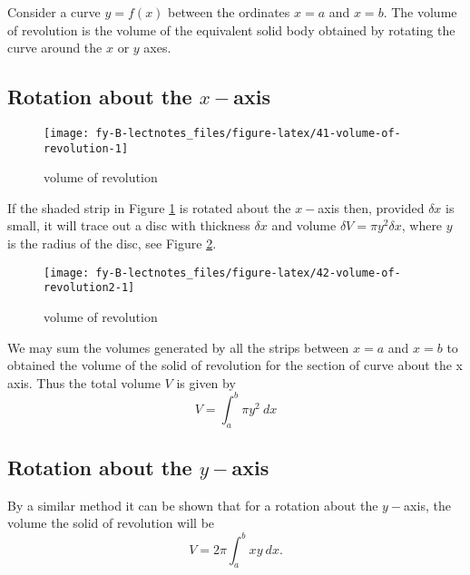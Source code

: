 \documentclass[
  11pt,
  oneside]{book}
\newcommand{\slide}{}
\theoremstyle{definition}
\theoremstyle{definition}
\theoremstyle{definition}
\theoremstyle{definition}
\theoremstyle{remark}
\begin{document}
Consider a curve \(y = f(x)\) between the ordinates \(x = a\) and \(x = b\). The volume of revolution is the volume of the equivalent solid body obtained by rotating the curve around the \(x\) or \(y\) axes.

\slide

\subsection{\texorpdfstring{Rotation about the \(x-\)axis}{Rotation about the x-axis}}\label{rotation-about-the-x-axis}

\begin{figure}

{\centering \texttt{[image: fy-B-lectnotes\_files/figure-latex/41-volume-of-revolution-1]} 

}

\caption{volume of revolution}\label{fig:41-volume-of-revolution}
\end{figure}

If the shaded strip in Figure \ref{fig:41-volume-of-revolution} is rotated about the \(x-\)axis then, provided \(\delta x\) is small, it will trace out a disc with thickness \(\delta x\) and volume \(\delta V = \pi y^2\delta x\), where \(y\) is the radius of the disc, see Figure \ref{fig:42-volume-of-revolution2}.
\slide

\begin{figure}

{\centering \texttt{[image: fy-B-lectnotes\_files/figure-latex/42-volume-of-revolution2-1]} 

}

\caption{volume of revolution}\label{fig:42-volume-of-revolution2}
\end{figure}

We may sum the volumes generated by all the strips between \(x = a\) and \(x = b\) to obtained the volume of the solid of revolution for the section of curve about the x axis.
Thus the total volume \(V\) is given by
\[
V = \int_a^b\pi y^2\ dx
\]
\slide

\subsection{\texorpdfstring{Rotation about the \(y-\)axis}{Rotation about the y-axis}}\label{rotation-about-the-y-axis}

By a similar method it can be shown that for a rotation about the \(y-\)axis, the volume the solid of revolution will be
\[
V = 2\pi\int_a^bxy\ dx.
\]
\slide
\end{document}
